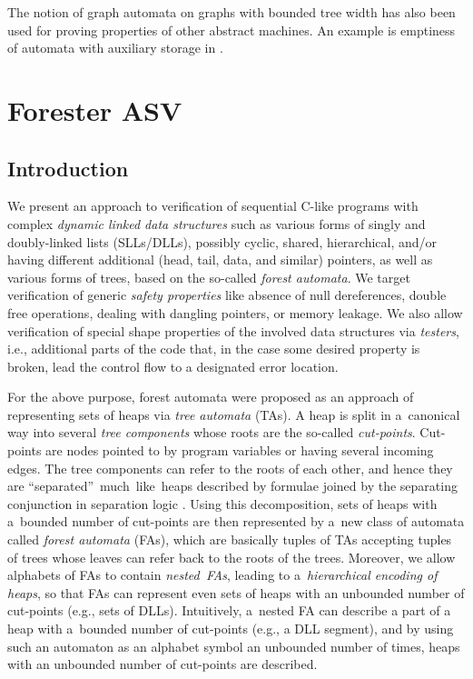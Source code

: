 	The notion of graph automata on graphs with bounded tree width has also been used
	for proving properties of other abstract machines.
	An example is emptiness of automata with auxiliary storage in \cite{soa-popl11tw}.

\chapter{Forester ASV}
\label{ch:asv}
\section{Introduction}\label{sec:label}


We present an approach to verification of sequential C-like programs with complex \emph{dynamic linked
data structures} such as various forms of singly and doubly-linked lists
(SLLs/DLLs), possibly cyclic, shared, hierarchical, and/or having different
additional (head, tail, data, and similar) pointers, as well as various forms
of trees, based on the so-called \emph{forest automata}. 
We target verification of generic \emph{safety
properties} like
absence of null dereferences, double free operations, dealing with dangling
pointers, or memory leakage. We also allow verification of special shape properties of
the involved data structures via \emph{testers}, i.e., additional parts of the
code that, in the
case some desired property is broken, lead the control flow to a designated
error location.

For the above purpose, forest automata were proposed as an approach of representing sets of heaps
via \emph{tree automata} (TAs). A heap is split in
a~canonical way into several \emph{tree components} whose roots are the so-called
\emph{cut-points}. Cut-points are nodes pointed to by program variables or
having several incoming edges. The tree components can refer to the roots of
each other, and hence they are ``separated''~much~like~heaps described by
formulae joined by the separating conjunction in separation logic
\cite{Reynolds:SepLogic:02}. Using this decomposition, sets of heaps with
a~bounded number of cut-points are then represented by a~new class of automata
called \emph{forest automata} (FAs), which are basically tuples of TAs accepting
tuples of trees whose leaves can refer back to the roots of the trees. Moreover,
we allow alphabets of FAs to contain \emph{nested~FAs}, leading to
a~\emph{hierarchical encoding of heaps}, so that FAs can represent even sets of
heaps with an unbounded number of cut-points (e.g., sets of DLLs). Intuitively,
a~nested FA can describe a part of a heap with a~bounded number of cut-points
(e.g., a DLL segment), and by using such an automaton as an alphabet symbol an
unbounded number of times,  heaps with an unbounded number of cut-points are
described. 

